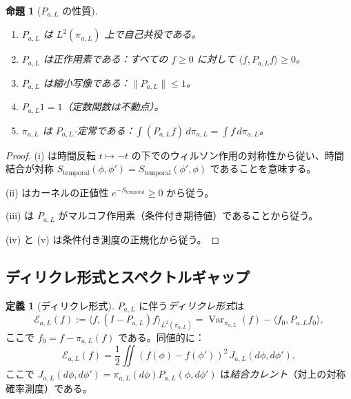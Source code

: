 \documentclass[12pt]{article}
\theoremstyle{plain}
\newtheorem{proposition}[theorem]{命題}
\theoremstyle{definition}
\newtheorem{definition}[theorem]{定義}
\numberwithin{equation}{section}
\newcommand{\Var}{\operatorname{Var}}
\begin{document}
\begin{proposition}[$P_{a,L}$ の性質]\label{prop:transferprops}
\begin{enumerate}[label=(\roman*)]
\item $P_{a,L}$ は $L^2(\pi_{a,L})$ 上で自己共役である。
\item $P_{a,L}$ は正作用素である：すべての $f\geq 0$ に対して $\langle f,P_{a,L}f\rangle\geq 0$。
\item $P_{a,L}$ は縮小写像である：$\|P_{a,L}\|\leq 1$。
\item $P_{a,L}1=1$（定数関数は不動点）。
\item $\pi_{a,L}$ は $P_{a,L}$-定常である：$\int(P_{a,L}f)\,d\pi_{a,L}=\int f\,d\pi_{a,L}$。
\end{enumerate}
\end{proposition}

\begin{proof}
(i) は時間反転 $t\mapsto-t$ の下でのウィルソン作用の対称性から従い、時間結合が対称 $S_{\mathrm{temporal}}(\phi,\phi')=S_{\mathrm{temporal}}(\phi',\phi)$ であることを意味する。

(ii) はカーネルの正値性 $e^{-S_{\mathrm{temporal}}}\geq 0$ から従う。

(iii) は $P_{a,L}$ がマルコフ作用素（条件付き期待値）であることから従う。

(iv) と (v) は条件付き測度の正規化から従う。
\end{proof}

\subsection{ディリクレ形式とスペクトルギャップ}

\begin{definition}[ディリクレ形式]
$P_{a,L}$ に伴う\emph{ディリクレ形式}は
\begin{equation}
\mathcal{E}_{a,L}(f) := \langle f,(I-P_{a,L})f\rangle_{L^2(\pi_{a,L})} = \Var_{\pi_{a,L}}(f) - \langle f_0,P_{a,L}f_0\rangle,
\end{equation}
ここで $f_0=f-\pi_{a,L}(f)$ である。同値的に：
\begin{equation}
\mathcal{E}_{a,L}(f) = \frac{1}{2}\iint(f(\phi)-f(\phi'))^2\,J_{a,L}(d\phi,d\phi'),
\end{equation}
ここで $J_{a,L}(d\phi,d\phi')=\pi_{a,L}(d\phi)P_{a,L}(\phi,d\phi')$ は\emph{結合カレント}（対上の対称確率測度）である。
\end{definition}
\end{document}

